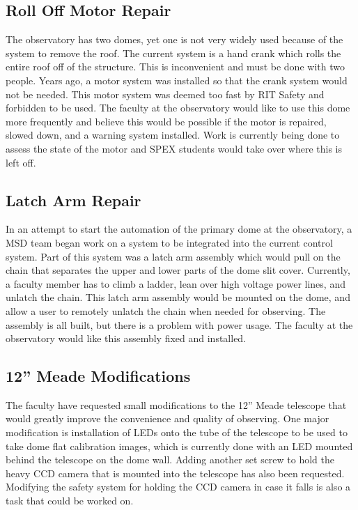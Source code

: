 \documentclass[conference]{IEEEtran} %
\begin{document}
  \subsection{Roll Off Motor Repair}
\label{subsec:rollOffMotorRepair}
The observatory has two domes, yet one is not very widely used because of the system to remove the roof.
The current system is a hand crank which rolls the entire roof off of the structure.
This is inconvenient and must be done with two people.
Years ago, a motor system was installed so that the crank system would not be needed.
This motor system was deemed too fast by RIT Safety and forbidden to be used.
The faculty at the observatory would like to use this dome more frequently and believe this would be possible if the motor is repaired, slowed down, and a warning system installed.
Work is currently being done to assess the state of the motor and SPEX students would take over where this is left off.

\subsection{Latch Arm Repair}
\label{subsec:latchArmRepair}
In an attempt to start the automation of the primary dome at the observatory, a MSD team began work on a system to be integrated into the current control system.
Part of this system was a latch arm assembly which would pull on the chain that separates the upper and lower parts of the dome slit cover.
Currently, a faculty member has to climb a ladder, lean over high voltage power lines, and unlatch the chain.
This latch arm assembly would be mounted on the dome, and allow a user to remotely unlatch the chain when needed for observing.
The assembly is all built, but there is a problem with power usage.
The faculty at the observatory would like this assembly fixed and installed.

\subsection{12'' Meade Modifications}
\label{subsec:meadeModifications}
The faculty have requested small modifications to the 12'' Meade telescope that would greatly improve the convenience and quality of observing.
One major modification is installation of LEDs onto the tube of the telescope to be used to take dome flat calibration images, which is currently done with an LED mounted behind the telescope on the dome wall.
Adding another set screw to hold the heavy CCD camera that is mounted into the telescope has also been requested.
Modifying the safety system for holding the CCD camera in case it falls is also a task that could be worked on.
\end{document}
